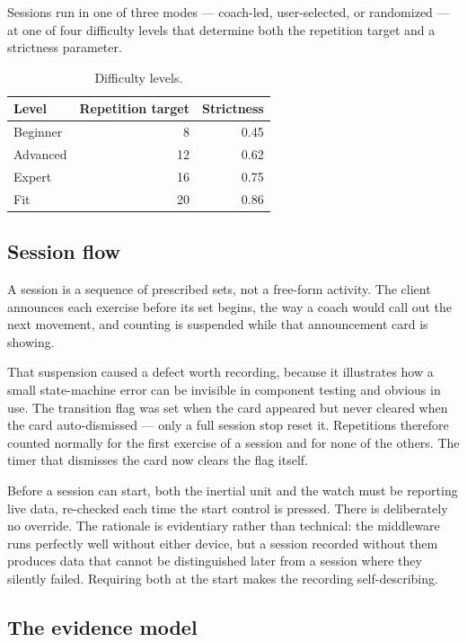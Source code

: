 \documentclass[11pt,a4paper]{article}
\begin{document}
Sessions run in one of three modes --- coach-led, user-selected, or randomized ---
at one of four difficulty levels that determine both the repetition target and a
strictness parameter.

\begin{table}[H]
\centering
\small
\caption{Difficulty levels.}
\begin{tabular}{@{}lrr@{}}
\toprule
\textbf{Level} & \textbf{Repetition target} & \textbf{Strictness} \\
\midrule
Beginner & 8  & 0.45 \\
Advanced & 12 & 0.62 \\
Expert   & 16 & 0.75 \\
Fit      & 20 & 0.86 \\
\bottomrule
\end{tabular}
\end{table}

\subsection{Session flow}

A session is a sequence of prescribed sets, not a free-form activity. The client
announces each exercise before its set begins, the way a coach would call out
the next movement, and counting is suspended while that announcement card is
showing.

That suspension caused a defect worth recording, because it illustrates how a
small state-machine error can be invisible in component testing and obvious in
use. The transition flag was set when the card appeared but never cleared when
the card auto-dismissed --- only a full session stop reset it. Repetitions
therefore counted normally for the first exercise of a session and for none of
the others. The timer that dismisses the card now clears the flag itself.

Before a session can start, both the inertial unit and the watch must be
reporting live data, re-checked each time the start control is pressed. There is
deliberately no override. The rationale is evidentiary rather than technical:
the middleware runs perfectly well without either device, but a session recorded
without them produces data that cannot be distinguished later from a session
where they silently failed. Requiring both at the start makes the recording
self-describing.

\subsection{The evidence model}
\label{sec:evidence}
\end{document}

